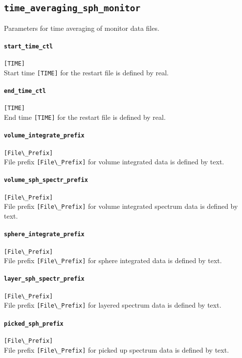 \subsection{\tt time\_averaging\_sph\_monitor}
\label{href_t:time_averaging_sph_monitor}
Parameters for time averaging of monitor data files.

\paragraph{\tt start\_time\_ctl}
\label{href_t:tave_start_time_ctl} 
\verb|[TIME]| \\
Start  time \verb|[TIME]| for the restart file is defined by real.

\paragraph{\tt end\_time\_ctl}
\label{href_t:tave_end_time_ctl} 
\verb|[TIME]| \\
End  time \verb|[TIME]| for the restart file is defined by real.

\paragraph{\tt volume\_integrate\_prefix}
\label{href_t:volume_integrate_prefix} 
\verb|[File\_Prefix]| \\
File prefix  \verb|[File\_Prefix]|  for  volume integrated data is defined by text.

\paragraph{\tt volume\_sph\_spectr\_prefix}
\label{href_t:volume_sph_spectr_prefix} 
\verb|[File\_Prefix]| \\
File prefix  \verb|[File\_Prefix]|  for  volume integrated spectrum data is defined by text.

\paragraph{\tt sphere\_integrate\_prefix}
\label{href_t:sphere_integrate_prefix} 
\verb|[File\_Prefix]| \\
File prefix  \verb|[File\_Prefix]|  for sphere integrated data is defined by text.

\paragraph{\tt layer\_sph\_spectr\_prefix}
\label{href_t:layer_sph_spectr_prefix} 
\verb|[File\_Prefix]| \\
File prefix  \verb|[File\_Prefix]|  for  layered spectrum data is defined by text.

\paragraph{\tt picked\_sph\_prefix}
\label{href_t:picked_sph_prefix} 
\verb|[File\_Prefix]| \\
File prefix  \verb|[File\_Prefix]|  for  picked up spectrum data is defined by text.


